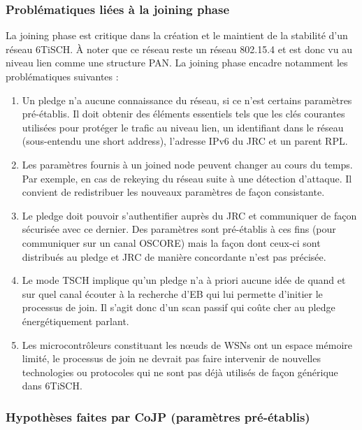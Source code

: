 \documentclass[]{report}
\begin{document}
\newpage

\subsubsection{Problématiques liées à la joining phase}

La joining phase est critique dans la création et le maintient de la stabilité d'un réseau 6TiSCH. À noter que ce réseau reste un réseau 802.15.4 et est donc vu au niveau lien comme une structure PAN. La joining phase encadre notamment les problématiques suivantes :
\vspace{0.2cm}
\begin{enumerate}
\item Un pledge n'a aucune connaissance du réseau, si ce n'est certains paramètres pré-établis. Il doit obtenir des éléments essentiels tels que les clés courantes utilisées pour protéger le trafic au niveau lien, un identifiant dans le réseau (sous-entendu une short address), l'adresse IPv6 du JRC et un parent RPL.
\vspace{0.2cm}
\item Les paramètres fournis à un joined node peuvent changer au cours du temps. Par exemple, en cas de rekeying du réseau suite à une détection d'attaque. Il convient de redistribuer les nouveaux paramètres de façon consistante.
\vspace{0.2cm}
\item Le pledge doit pouvoir s'authentifier auprès du JRC et communiquer de façon sécurisée avec ce dernier. Des paramètres sont pré-établis à ces fins (pour communiquer sur un canal OSCORE) mais la façon dont ceux-ci sont distribués au pledge et JRC de manière concordante n'est pas précisée.
\vspace{0.2cm}
\item Le mode TSCH implique qu'un pledge n'a à priori aucune idée de quand et sur quel canal écouter à la recherche d'EB qui lui permette d'initier le processus de join. Il s'agit donc d'un scan passif qui coûte cher au pledge énergétiquement parlant.
\vspace{0.2cm}
\item Les microcontrôleurs constituant les nœuds de WSNs ont un espace mémoire limité, le processus de join ne devrait pas faire intervenir de nouvelles technologies ou protocoles qui ne sont pas déjà utilisés de façon générique dans 6TiSCH.
\end{enumerate}

\subsubsection{Hypothèses faites par CoJP (paramètres pré-établis)}
\label{preshared_join}
\end{document}
